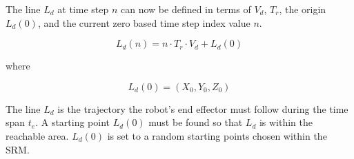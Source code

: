 The line $L_d$ at time step $n$ can now be defined in terms of $V_d$, $T_r$, the origin $L_d(0)$, and the current zero based time step index value $n$.

\begin{equation}
L_d(n) = n \cdot T_r \cdot V_d + L_d(0)
\end{equation}







where 

\begin{equation}
L_d(0) = (X_0, Y_0, Z_0)
\end{equation}



The line $L_d$ is the trajectory the robot's end effector must follow during the time span $t_e$.  A starting point $L_d(0)$ must be found so that $L_d$ is within the reachable area.  $L_d(0)$ is set to a random starting points chosen within the SRM.  

